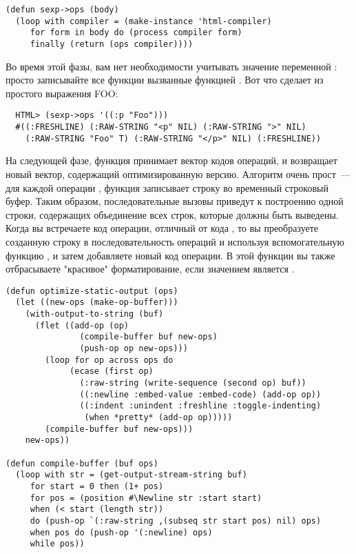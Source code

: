 \begin{lstlisting}
(defun sexp->ops (body)
  (loop with compiler = (make-instance 'html-compiler)
     for form in body do (process compiler form)
     finally (return (ops compiler))))
\end{lstlisting}

Во время этой фазы, вам нет необходимости учитывать значение переменной :
просто записывайте все функции вызванные функцией .  Вот что
 сделает из простого выражения FOO:

\begin{lstlisting}
  HTML> (sexp->ops '((:p "Foo")))
  #((:FRESHLINE) (:RAW-STRING "<p" NIL) (:RAW-STRING ">" NIL)
    (:RAW-STRING "Foo" T) (:RAW-STRING "</p>" NIL) (:FRESHLINE))
\end{lstlisting}

На следующей фазе, функция  принимает вектор кодов операций,
и возвращает новый вектор, содержащий оптимизированную версию.  Алгоритм очень прост~---
для каждой операции , функция записывает строку во временный строковый
буфер. Таким образом, последовательные вызовы  приведут к построению
одной строки, содержащих объединение всех строк, которые должны быть выведены. Когда вы
встречаете код операции, отличный от кода , то вы преобразуете созданную
строку в последовательность операций  и  используя
вспомогательную функцию , и затем добавляете новый код операции.  В
этой функции вы также отбрасываете "красивое" форматирование, если значением
 является .

\begin{lstlisting}
(defun optimize-static-output (ops)
  (let ((new-ops (make-op-buffer)))
    (with-output-to-string (buf)
      (flet ((add-op (op) 
               (compile-buffer buf new-ops)
               (push-op op new-ops)))
        (loop for op across ops do
             (ecase (first op)
               (:raw-string (write-sequence (second op) buf))
               ((:newline :embed-value :embed-code) (add-op op))
               ((:indent :unindent :freshline :toggle-indenting)
                (when *pretty* (add-op op)))))
        (compile-buffer buf new-ops)))
    new-ops))

(defun compile-buffer (buf ops)
  (loop with str = (get-output-stream-string buf)
     for start = 0 then (1+ pos)
     for pos = (position #\Newline str :start start)
     when (< start (length str))
     do (push-op `(:raw-string ,(subseq str start pos) nil) ops)
     when pos do (push-op '(:newline) ops)
     while pos))
\end{lstlisting}

